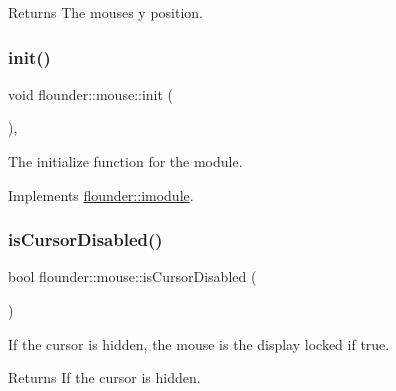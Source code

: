 \begin{DoxyReturn}{Returns}
The mouses y position. 
\end{DoxyReturn}
\mbox{\label{classflounder_1_1mouse_a8a550ad472e61ed74ca42c07777bdd1f}} 
\subsubsection{\texorpdfstring{init()}{init()}}
{\footnotesize\ttfamily void flounder\+::mouse\+::init (\begin{DoxyParamCaption}{ }\end{DoxyParamCaption})\hspace{0.3cm}{\ttfamily [override]}, {\ttfamily [virtual]}}



The initialize function for the module. 



Implements \hyperlink{classflounder_1_1imodule_a1725ef346952884d0741de61aba1e0c7}{flounder\+::imodule}.

\mbox{\label{classflounder_1_1mouse_a84181116f71d9f8e3c01afca2aa2554f}} 
\subsubsection{\texorpdfstring{is\+Cursor\+Disabled()}{isCursorDisabled()}}
{\footnotesize\ttfamily bool flounder\+::mouse\+::is\+Cursor\+Disabled (\begin{DoxyParamCaption}{ }\end{DoxyParamCaption})}



If the cursor is hidden, the mouse is the display locked if true. 

\begin{DoxyReturn}{Returns}
If the cursor is hidden. 
\end{DoxyReturn}
\mbox{\label{classflounder_1_1mouse_a68cff5b3c6384eda1048db5894d65887}} 
